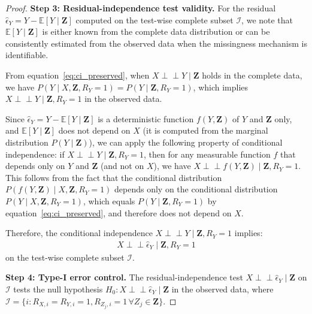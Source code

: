 \documentclass[runningheads]{llncs}
\begin{document}
\begin{proof}
\vspace{0.1cm}

\textbf{Step 3: Residual-independence test validity.}
For the residual $\hat{\epsilon}_Y = Y - \mathbb{E}[Y \mid \mathbf{Z}]$ computed on the test-wise complete subset $\mathcal{I}$, we note that $\mathbb{E}[Y \mid \mathbf{Z}]$ is either known from the complete data distribution or can be consistently estimated from the observed data when the missingness mechanism is identifiable.

From equation~\eqref{eq:ci_preserved}, when $X \perp\!\!\!\perp Y \mid \mathbf{Z}$ holds in the complete data, we have $P(Y \mid X, \mathbf{Z}, R_Y = 1) = P(Y \mid \mathbf{Z}, R_Y = 1)$, which implies $X \perp\!\!\!\perp Y \mid \mathbf{Z}, R_Y = 1$ in the observed data.

Since $\hat{\epsilon}_Y = Y - \mathbb{E}[Y \mid \mathbf{Z}]$ is a deterministic function $f(Y, \mathbf{Z})$ of $Y$ and $\mathbf{Z}$ only, and $\mathbb{E}[Y \mid \mathbf{Z}]$ does not depend on $X$ (it is computed from the marginal distribution $P(Y \mid \mathbf{Z})$), we can apply the following property of conditional independence: if $X \perp\!\!\!\perp Y \mid \mathbf{Z}, R_Y = 1$, then for any measurable function $f$ that depends only on $Y$ and $\mathbf{Z}$ (and not on $X$), we have $X \perp\!\!\!\perp f(Y, \mathbf{Z}) \mid \mathbf{Z}, R_Y = 1$. This follows from the fact that the conditional distribution $P(f(Y, \mathbf{Z}) \mid X, \mathbf{Z}, R_Y = 1)$ depends only on the conditional distribution $P(Y \mid X, \mathbf{Z}, R_Y = 1)$, which equals $P(Y \mid \mathbf{Z}, R_Y = 1)$ by equation~\eqref{eq:ci_preserved}, and therefore does not depend on $X$.

Therefore, the conditional independence $X \perp\!\!\!\perp Y \mid \mathbf{Z}, R_Y = 1$ implies:
\begin{align}
X \perp\!\!\!\perp \hat{\epsilon}_Y \mid \mathbf{Z}, R_Y = 1 \label{eq:residual_independence}
\end{align}
on the test-wise complete subset $\mathcal{I}$.

\vspace{0.1cm}

\textbf{Step 4: Type-I error control.}
The residual-independence test $X \perp\!\!\!\perp \hat{\epsilon}_Y \mid \mathbf{Z}$ on $\mathcal{I}$ tests the null hypothesis $H_0: X \perp\!\!\!\perp \hat{\epsilon}_Y \mid \mathbf{Z}$ in the observed data, where $\mathcal{I} = \{i : R_{X,i} = R_{Y,i} = 1, R_{Z_j,i} = 1 \,\forall Z_j \in \mathbf{Z}\}$.


\end{proof}
\end{document}

